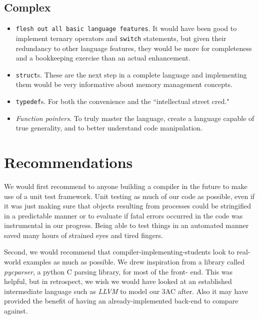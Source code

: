 \documentclass{article}
\begin{document}
\subsection{Complex}
  \begin{itemize}
  \item \texttt{flesh out all basic language features}. It would have been good
        to implement ternary operators and \texttt{switch} statements, but given
        their redundancy to other language features, they would be more for 
        completeness and a bookkeeping exercise than an actual enhancement.

  \item \texttt{struct}s. These are the next step in a complete language and
        implementing them would be very informative about memory management
        concepts.

  \item \texttt{typedef}s. For both the convenience and the ``intellectual
        street cred."

  \item \textit{Function pointers}. To truly master the language, create a
        language capable of true generality, and to better understand code
        manipulation. 
  \end{itemize}

\section{Recommendations}
We would first recommend to anyone building a compiler in the future to make
use of a unit test framework. Unit testing as much of our code as possible,
even if it was just making sure that objects resulting from processes could
be stringified in a predictable manner or to evaluate if fatal errors occurred
in the code was instrumental in our progress. Being able to test things in an
automated manner saved many hours of strained eyes and tired fingers.

Second, we would recommend that compiler-implementing-students look to
real-world examples as much as possible. We drew inspiration from a library
called \textit{pycparser}, a python C parsing library, for most of the front-
end. This was helpful, but in retrospect, we wish we would have looked at an
established intermediate language such as \textit{LLVM} to model our 3AC after.
Also it may have provided the benefit of having an already-implemented back-end
to compare against.
\end{document}
